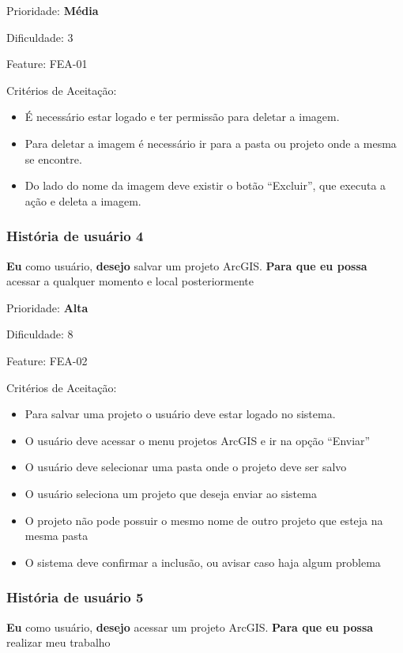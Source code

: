     Prioridade: \textbf{Média}

    Dificuldade: 3

    Feature: FEA-01

    Critérios de Aceitação:
    \begin{itemize}
      \item É necessário estar logado e ter permissão para deletar a imagem. 
      \item Para deletar a  imagem é necessário ir para a pasta ou projeto onde a mesma se encontre.
      \item Do lado do nome da imagem deve existir o botão “Excluir”, que executa a ação e deleta a imagem.
    \end{itemize}


  \subsubsection{História de usuário 4}
    \textbf{Eu} como usuário, \textbf{desejo} salvar um projeto ArcGIS. \textbf{Para que eu possa} acessar a qualquer momento e local posteriormente

    Prioridade: \textbf{Alta}

    Dificuldade: 8

    Feature: FEA-02

    Critérios de Aceitação:
    \begin{itemize}
      \item Para salvar uma projeto o usuário deve estar logado no sistema.
      \item O usuário deve acessar o menu projetos ArcGIS e ir na opção “Enviar”
      \item O usuário deve selecionar uma pasta onde o projeto deve ser salvo 
      \item O usuário seleciona um projeto que deseja enviar ao sistema
      \item O projeto não pode possuir o mesmo nome de outro projeto que esteja na mesma pasta
      \item O sistema deve confirmar a inclusão, ou avisar caso haja algum problema
    \end{itemize}

  \subsubsection{História de usuário 5}
    \textbf{Eu} como usuário, \textbf{desejo} acessar um projeto ArcGIS. \textbf{Para que eu possa} realizar meu trabalho

